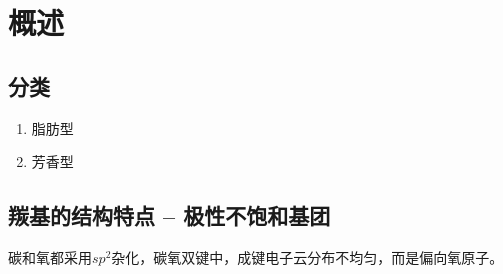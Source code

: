 
    \section{概述}

    \subsection{分类}

    \begin{enumerate}
        \item 脂肪型
        \item 芳香型
    \end{enumerate}

    \subsection{羰基的结构特点 -- 极性不饱和基团}

    碳和氧都采用$sp^2$杂化，碳氧双键中，成键电子云分布不均匀，而是偏向氧原子。
